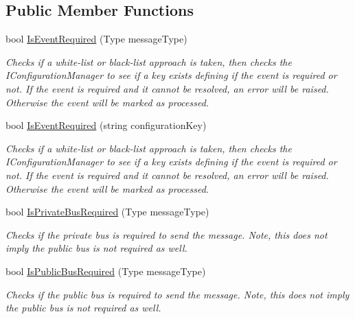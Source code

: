 \subsection*{Public Member Functions}
\begin{DoxyCompactItemize}
\item 
bool \hyperlink{interfaceCqrs_1_1Bus_1_1IBusHelper_acddf7635d6de08e3b09d552361fe4fda_acddf7635d6de08e3b09d552361fe4fda}{Is\+Event\+Required} (Type message\+Type)
\begin{DoxyCompactList}\small\item\em Checks if a white-\/list or black-\/list approach is taken, then checks the I\+Configuration\+Manager to see if a key exists defining if the event is required or not. If the event is required and it cannot be resolved, an error will be raised. Otherwise the event will be marked as processed. \end{DoxyCompactList}\item 
bool \hyperlink{interfaceCqrs_1_1Bus_1_1IBusHelper_af73d0d2aa8e98566acb4b2fb13a3e986_af73d0d2aa8e98566acb4b2fb13a3e986}{Is\+Event\+Required} (string configuration\+Key)
\begin{DoxyCompactList}\small\item\em Checks if a white-\/list or black-\/list approach is taken, then checks the I\+Configuration\+Manager to see if a key exists defining if the event is required or not. If the event is required and it cannot be resolved, an error will be raised. Otherwise the event will be marked as processed. \end{DoxyCompactList}\item 
bool \hyperlink{interfaceCqrs_1_1Bus_1_1IBusHelper_af73d5bb5f33e9d8422309f6b3ac73369_af73d5bb5f33e9d8422309f6b3ac73369}{Is\+Private\+Bus\+Required} (Type message\+Type)
\begin{DoxyCompactList}\small\item\em Checks if the private bus is required to send the message. Note, this does not imply the public bus is not required as well. \end{DoxyCompactList}\item 
bool \hyperlink{interfaceCqrs_1_1Bus_1_1IBusHelper_a20c51abf04c3c0682fcb5da4c1a371ba_a20c51abf04c3c0682fcb5da4c1a371ba}{Is\+Public\+Bus\+Required} (Type message\+Type)
\begin{DoxyCompactList}\small\item\em Checks if the public bus is required to send the message. Note, this does not imply the public bus is not required as well. \end{DoxyCompactList}\item 

\end{DoxyCompactItemize}
